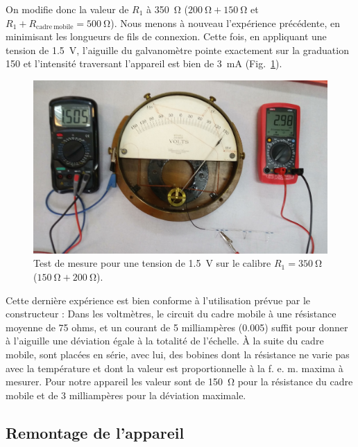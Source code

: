 \documentclass[12pt,a4paper,fleqn]{article}
\begin{document}
On modifie donc la valeur de $R_1$ à \qty{350}{\ohm} ($\qty{200}{\ohm} + \qty{150}{\ohm}$ et $R_1 + R_\mathrm{cadre\ mobile} = \qty{500}{\ohm}$).
Nous menons à nouveau l'expérience précédente, en minimisant les longueurs de fils de connexion.
Cette fois, en appliquant une tension de \qty{1,5}{V}, l'aiguille du galvanomètre pointe exactement sur la graduation \num{150} et l'intensité traversant l'appareil est bien de \qty{3}{mA} (Fig.~\ref{fig:galva_volt_good}).

\begin{figure}[htbp]
    \center
    \includegraphics[width=\linewidth]{images/20210312_112818.jpg}
    \caption{Test de mesure pour une tension de \qty{1,5}{V} sur le calibre $R_1 = \qty{350}{\ohm}$ ($\qty{150}{\ohm} + \qty{200}{\ohm}$).
    \label{fig:galva_volt_good}
}
\end{figure}

Cette dernière expérience est bien conforme à l'utilisation prévue par le constructeur : \og Dans les voltmètres, le circuit du cadre mobile à une résistance moyenne de 75 ohms, et un courant de 5 milliampères (0.005) suffit pour donner à l'aiguille une déviation égale à la totalité de l'échelle.
À la suite du cadre mobile, sont placées en série, avec lui, des bobines dont la résistance ne varie pas avec la température et dont la valeur est proportionnelle à la f. e. m. maxima à mesurer. \fg{}
Pour notre appareil les valeur sont de \qty{150}{\ohm} pour la résistance du cadre mobile et de 3 milliampères pour la déviation maximale.

\subsection{Remontage de l'appareil}
\label{sec:remontage_volt}
\end{document}
